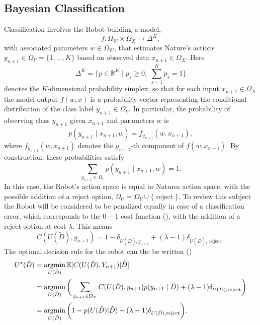 \subsection{Bayesian Classification}
\label{chp:baycl}
Classification involves the Robot building a model,
\begin{equation}
	f: \Omega_W \times \Omega_X \to \Delta^K,
\end{equation}
with associated parameters $w \in \Omega_W$, that estimates Nature's actions $y_{n+1}\in \Omega_Y= \{1,\dots,K\}$ based on observed data $x_{n+1}\in \Omega_X$. Here
\begin{equation}
	\Delta^K = \{p \in \mathbb{R}^K \mid p_s \geq 0,\; \sum_{s=1}^K p_s = 1\}
\end{equation} 
denotes the $K$-dimensional probability simplex, so that for each input $x_{n+1} \in \Omega_X$ the model output $f(w,x)$ is a probability vector representing the conditional distribution of the class label $y_{n+1} \in \Omega_Y$. In particular, the probability of observing class $y_{n+1}$ given $x_{n+1}$ and parameters $w$ is 
\begin{equation}
	p(y_{n+1} \mid x_{n+1}, w) = f_{y_{n+1}}(w,x_{n+1}),
	\label{f_dist2}
\end{equation}
where $f_{y_{n+1}}(w,x_{n+1})$ denotes the $y_{n+1}$-th component of $f(w,x_{n+1})$. 
By construction, these probabilities satisfy
\begin{equation}
	\sum_{y_{n+1} \in \Omega_Y} p(y_{n+1} \mid x_{n+1}, w) = 1.
\end{equation}
In this case, the Robot's action space is equal to Natures action space, with the possible addition of a reject option, $\Omega_U=\Omega_Y\cup \{\operatorname{reject}\}$. To review this subject the Robot will be considered to be penalized equally in case of a classification error, which corresponds to the $0-1$ cost function (), with the addition of a reject option at cost $\lambda$. This means
\begin{equation}
	C(U(\tilde{D}),y_{n+1}) = 1- \delta_{U(\tilde{D}),y_{n+1}}+(\lambda-1)\delta_{U(\tilde{D}),\operatorname{reject}}.
\end{equation}
The optimal decision rule for the robot can the be written ()
\begin{equation}
	\begin{split}
		U^*(\tilde{D}) & = \operatorname*{argmin}_{U(\tilde{D})}\mathbb{E}[C(U(\tilde{D}), Y_{n+1})|\tilde{D}]\\
		&= \operatorname*{argmin}_{U(\tilde{D})}\bigg(\sum_{y_{n+1}\in \Omega_Y}C(U(\tilde{D}),y_{n+1})p(y_{n+1}\mid\tilde{D})+(\lambda-1)\delta_{U(\tilde{D}),\operatorname{reject}}\bigg)\\
		& = \operatorname*{argmin}_{U(\tilde{D})}\bigg(1- p(U(\tilde{D})|\tilde{D})+(\lambda-1)\delta_{U(\tilde{D}),\operatorname{reject}}\bigg).
	\end{split}
	\label{eq:expected_cost1}
\end{equation}
